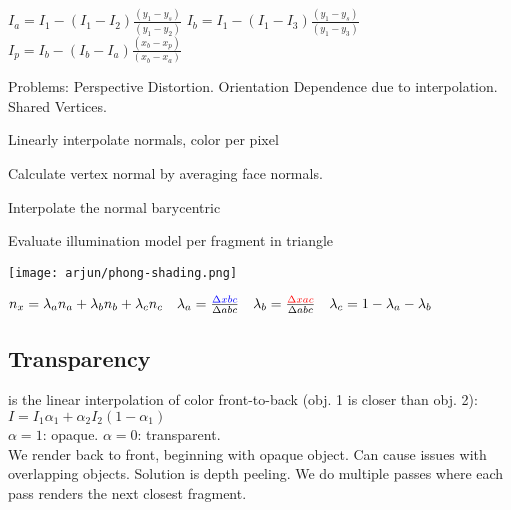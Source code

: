 $I_a = I_1 - (I_1 - I_2)\frac{(y_1-y_s)}{(y_1 - y_2)}$  
$I_b = I_1 - \left(I_1 - I_3\right) \frac{\left(y_1 - y_s\right)}{\left(y_1 - y_3\right)}$ 
$I_p = I_b - \left(I_b - I_a\right) \frac{\left(x_b - x_p\right)}{\left(x_b - x_a\right)}
$

Problems: Perspective Distortion. Orientation Dependence due to interpolation. Shared Vertices.

 Linearly interpolate normals, color per pixel
\begin{compactenum}
    \item Calculate vertex normal by averaging face normals.
    \item Interpolate the normal barycentric
    \item Evaluate illumination model per fragment in triangle
\end{compactenum}
\begin{center}
    \texttt{[image: arjun/phong-shading.png]}
\end{center}

$ n_x = \lambda_an_a + \lambda_bn_b + \lambda_cn_c  \quad \lambda_a = \frac{\color{blue} \Delta xbc}{\Delta abc} \quad \lambda_b = \frac{\color{red} \Delta xac}{\Delta abc} \quad \lambda_c = 1 - \lambda_a - \lambda_b$ 

\subsection*{Transparency}
 is the linear interpolation of color front-to-back (obj. 1 is closer than obj. 2): $I = I_1 \alpha_1 + \alpha_2 I_2 (1 - \alpha_1)$\\
$\alpha = 1 $: opaque. $\alpha = 0$: transparent.\\
We render back to front, beginning with opaque object. Can cause issues with overlapping objects. Solution is depth peeling. We do multiple passes where each pass renders the next closest fragment.